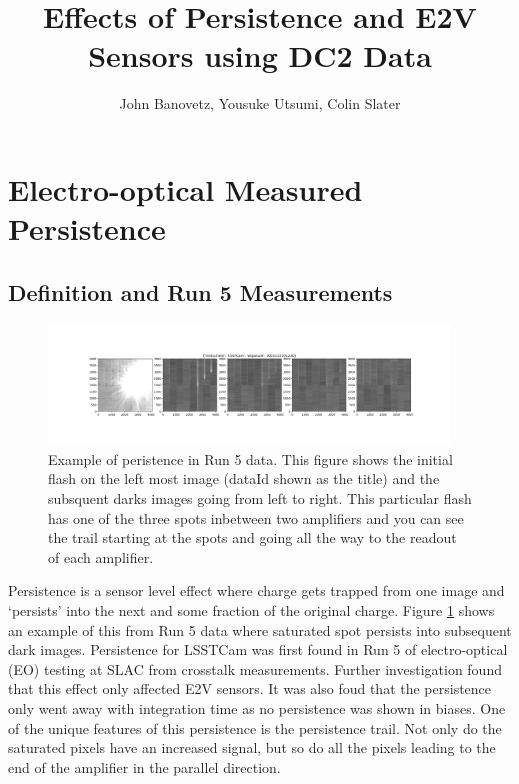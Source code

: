 \documentclass[DM,authoryear,toc]{lsstdoc}
\title{Effects of Persistence and E2V Sensors using DC2 Data}
\author{%
John Banovetz,
Yousuke Utsumi,
Colin Slater
}
\date{\vcsDate}
\begin{document}
\maketitle


\section{Electro-optical Measured Persistence}
\subsection{Definition and Run 5 Measurements}

\begin{figure}[!htp]
  \centering
  \includegraphics[width=0.95\textwidth, angle=0]{Run_5_persistence_ex.png}
  \caption{
  Example of peristence in Run 5 data. 
  This figure shows the initial flash on the left most image (dataId shown as the title) and the subsquent darks images going from left to right.
  This particular flash has one of the three spots inbetween two amplifiers and you can see the trail starting at the spots and going all the way to the readout of each amplifier.
  }\label{fig:ex_persistence_Run5}
\end{figure}



Persistence is a sensor level effect where charge gets trapped from one image and `persists' into the next and some fraction of the original charge. 
Figure \ref{fig:ex_persistence_Run5} shows an example of this from Run 5 data where saturated spot persists into subsequent dark images. 
Persistence for LSSTCam was first found in Run 5 of electro-optical (EO) testing at SLAC from crosstalk measurements. 
Further investigation found that this effect only affected E2V sensors. 
It was also foud that the persistence only went away with integration time as no persistence was shown in biases. 
One of the unique features of this persistence is the persistence trail. 
Not only do the saturated pixels have an increased signal, but so do all the pixels leading to the end of the amplifier in the parallel direction.
\end{document}
